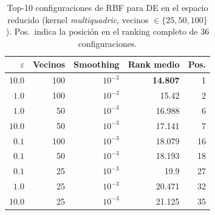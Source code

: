 \begin{table}[H]
    \centering
    \small
    \setlength{\tabcolsep}{5pt}
    \begin{tabular}{rrr|rr}
        \toprule
        \textbf{$\varepsilon$} & \textbf{Vecinos} & \textbf{Smoothing} & \textbf{Rank medio} & \textbf{Pos.} \\
        \midrule
        $10.0$ & 100 & $10^{-3}$ & \textbf{14.807} & 1 \\
        $1.0$ & 100 & $10^{-3}$ & 15.42 & 2 \\
        $1.0$ & 50 & $10^{-3}$ & 16.988 & 6 \\
        $10.0$ & 50 & $10^{-3}$ & 17.141 & 7 \\
        $0.1$ & 100 & $10^{-3}$ & 18.079 & 16 \\
        $0.1$ & 50 & $10^{-3}$ & 18.193 & 18 \\
        $0.1$ & 25 & $10^{-3}$ & 19.9 & 27 \\
        $1.0$ & 25 & $10^{-3}$ & 20.471 & 32 \\
        $10.0$ & 25 & $10^{-3}$ & 21.125 & 35 \\
        \bottomrule
    \end{tabular}
    \caption{Top-10 configuraciones de RBF para DE en el espacio reducido (kernel \textit{multiquadric}, vecinos $\in\{25, 50, 100\}$). Pos.\ indica la posición en el ranking completo de 36 configuraciones.}
    \label{tab:rbf_apendice_de}
\end{table}

